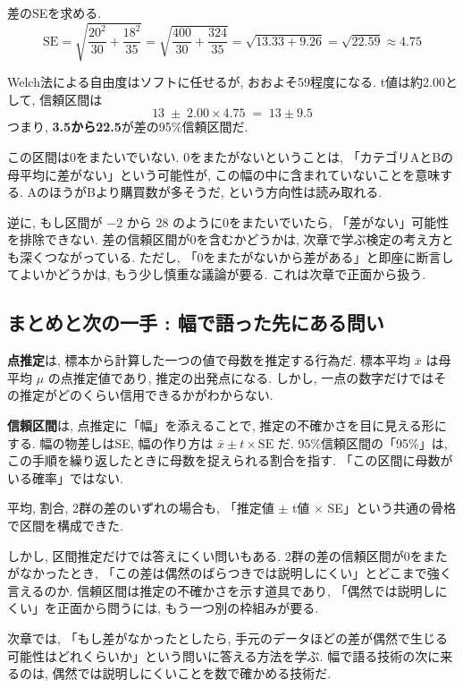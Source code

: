 差のSEを求める.
\[
  \mathrm{SE} = \sqrt{\frac{20^2}{30} + \frac{18^2}{35}} = \sqrt{\frac{400}{30} + \frac{324}{35}} = \sqrt{13.33 + 9.26} = \sqrt{22.59} \approx 4.75
\]

Welch法による自由度はソフトに任せるが, おおよそ59程度になる.
t値は約2.00として, 信頼区間は
\[
  13 \;\pm\; 2.00 \times 4.75 \;=\; 13 \pm 9.5
\]
つまり, \textbf{3.5から22.5}が差の95\%信頼区間だ.

この区間は0をまたいでいない.
0をまたがないということは, 「カテゴリAとBの母平均に差がない」という可能性が, この幅の中に含まれていないことを意味する.
AのほうがBより購買数が多そうだ, という方向性は読み取れる.

逆に, もし区間が $-2$ から $28$ のように0をまたいでいたら, 「差がない」可能性を排除できない.
差の信頼区間が0を含むかどうかは, 次章で学ぶ検定の考え方とも深くつながっている.
ただし, 「0をまたがないから差がある」と即座に断言してよいかどうかは, もう少し慎重な議論が要る.
これは次章で正面から扱う.


\subsection{まとめと次の一手 : 幅で語った先にある問い}

\textbf{点推定}は, 標本から計算した一つの値で母数を推定する行為だ.
標本平均 $\bar{x}$ は母平均 $\mu$ の点推定値であり, 推定の出発点になる.
しかし, 一点の数字だけではその推定がどのくらい信用できるかがわからない.

\textbf{信頼区間}は, 点推定に「幅」を添えることで, 推定の不確かさを目に見える形にする.
幅の物差しはSE, 幅の作り方は $\bar{x} \pm t \times \mathrm{SE}$ だ.
95\%信頼区間の「95\%」は, この手順を繰り返したときに母数を捉えられる割合を指す.
「この区間に母数がいる確率」ではない.

平均, 割合, 2群の差のいずれの場合も, 「推定値 $\pm$ t値 $\times$ SE」という共通の骨格で区間を構成できた.

しかし, 区間推定だけでは答えにくい問いもある.
2群の差の信頼区間が0をまたがなかったとき, 「この差は偶然のばらつきでは説明しにくい」とどこまで強く言えるのか.
信頼区間は推定の不確かさを示す道具であり, 「偶然では説明しにくい」を正面から問うには, もう一つ別の枠組みが要る.

次章では, 「もし差がなかったとしたら, 手元のデータほどの差が偶然で生じる可能性はどれくらいか」という問いに答える方法を学ぶ.
幅で語る技術の次に来るのは, 偶然では説明しにくいことを数で確かめる技術だ.
